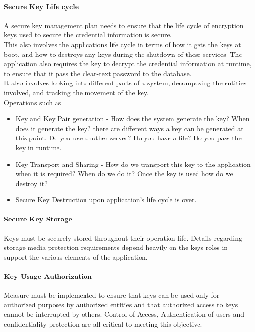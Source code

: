 \documentclass[12pt]{article}
\begin{document}
\paragraph{Secure Key Life cycle} 
A secure key management plan needs to ensure that the life cycle of encryption keys used to secure the credential information is secure. \\

This also involves the applications life cycle in terms of how it gets the keys at boot, and how to destroys any keys during the shutdown of these services. The application also requires the key  to decrypt the credential information at runtime, to ensure that it pass the clear-text password to the database. \\  

It also involves looking into different parts of a system, decomposing the entities involved, and tracking the movement of the key. \\

Operations such as 
\begin{itemize}
\item Key and Key Pair generation - How does the system generate the key? When does it generate the key? 
there are different ways a key can be generated at this point. Do you use another server? Do you have a file? Do you pass the key in runtime.

\item Key Transport and Sharing - How do we transport this key to the application when it is required? When do we do it? Once the key is used how do we destroy it? 

\item Secure Key Destruction  upon application's life cycle is over.
\end{itemize}

\paragraph{Secure Key Storage}
Keys must be securely stored throughout their operation life. Details regarding storage media protection requirements depend heavily on the keys roles in support the various elements of the application. 

\paragraph{Key Usage Authorization}
Measure must be implemented to ensure that keys can be used only for authorized purposes by authorized entities
and that authorized access to keys cannot be interrupted by others. Control of Access, Authentication of users and confidentiality protection are all critical to meeting this objective.
\end{document}
